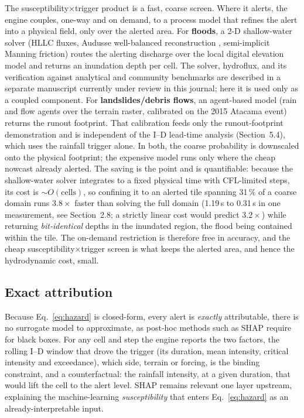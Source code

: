 \documentclass[authoryear,preprint,review,12pt]{elsarticle}
\begin{document}
The susceptibility$\times$trigger product is a fast, coarse screen. Where it
alerts, the engine couples, one-way and on demand, to a process model that
refines the alert into a physical field, only over the alerted area. For
\textbf{floods}, a 2-D shallow-water solver (HLLC fluxes, Audusse well-balanced
reconstruction \citep{audusse2004}, semi-implicit Manning friction) routes the
alerting discharge over the local digital elevation model and returns an inundation depth per cell. The solver, hydroflux, and its verification against analytical and community benchmarks are described in a separate manuscript currently under review in this journal; here it is used only as a coupled component. For \textbf{landslides/debris flows}, an agent-based
model (rain and flow agents over the terrain raster, calibrated on the 2015
Atacama event) returns the runout footprint. That calibration feeds only the
runout-footprint demonstration and is independent of the I--D lead-time analysis
(Section~5.4), which uses the rainfall trigger alone. In both, the coarse probability is
downscaled onto the physical footprint; the expensive model runs only where the
cheap nowcast already alerted. The saving is the point and is quantifiable:
because the shallow-water solver integrates to a fixed physical time with
CFL-limited steps, its cost is ${\sim}O(\mathrm{cells})$, so confining it to an
alerted tile spanning 31\,\% of a coarse domain runs $3.8\times$ faster than
solving the full domain (1.19\,s to 0.31\,s in one measurement, see Section~2.8; a strictly linear cost would predict $3.2\times$) while returning \emph{bit-identical}
depths in the inundated region, the flood being contained within the tile. The
on-demand restriction is therefore free in accuracy, and the cheap
susceptibility$\times$trigger screen is what keeps the alerted area, and hence the
hydrodynamic cost, small.

\subsection{Exact attribution}

Because Eq.~\eqref{eq:hazard} is closed-form, every alert is \emph{exactly}
attributable, there is no surrogate model to approximate, as post-hoc methods
such as SHAP \citep{lundberg2017} require for black boxes. For any cell and step
the engine reports the two factors, the rolling I--D window that drove the trigger
(its duration, mean intensity, critical intensity and exceedance), which
side, terrain or forcing, is the binding constraint, and a counterfactual: the
rainfall intensity, at a given duration, that would lift the cell to the alert
level. SHAP remains relevant one layer upstream, explaining the machine-learning
\emph{susceptibility} that enters Eq.~\eqref{eq:hazard} as an
already-interpretable input.
\end{document}
